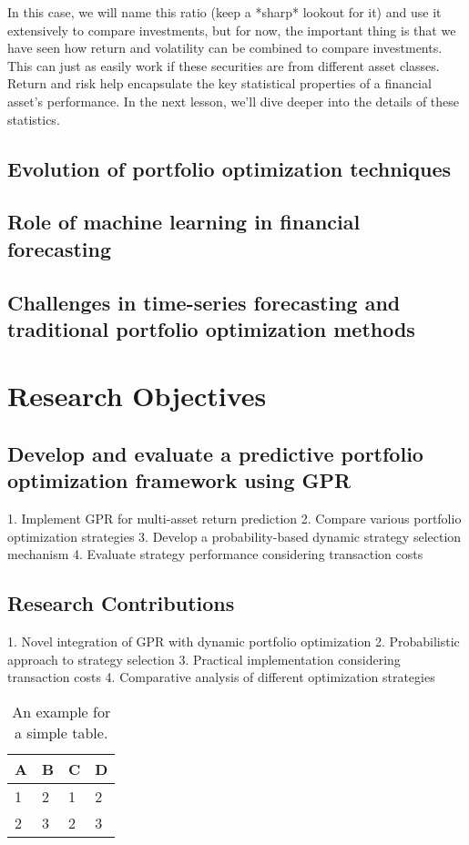 In this case, we will name this ratio (keep a *sharp* lookout for it) and use it extensively to compare investments, but for now, the important thing is that we have seen how return and volatility can be combined to compare investments. This can just as easily work if these securities are from different asset classes. Return and risk help encapsulate the key statistical properties of a financial asset's performance. In the next lesson, we’ll dive deeper into the details of these statistics.

\subsection{Evolution of portfolio optimization techniques}
\subsection{Role of machine learning in financial forecasting}
\subsection{Challenges in time-series forecasting and traditional portfolio optimization methods}

\section{Research Objectives}

\subsection{Develop and evaluate a predictive portfolio optimization framework using GPR}
1. Implement GPR for multi-asset return prediction
2. Compare various portfolio optimization strategies
3. Develop a probability-based dynamic strategy selection mechanism
4. Evaluate strategy performance considering transaction costs

\subsection{Research Contributions}
1. Novel integration of GPR with dynamic portfolio optimization
2. Probabilistic approach to strategy selection
3. Practical implementation considering transaction costs
4. Comparative analysis of different optimization strategies



\begin{table}[htpb]
  \caption[Example table]{An example for a simple table.}
  \centering
  \begin{tabular}{l l l l}
    \toprule
      A & B & C & D \\
    \midrule
      1 & 2 & 1 & 2 \\
      2 & 3 & 2 & 3 \\
    \bottomrule
  \end{tabular}
\end{table}

